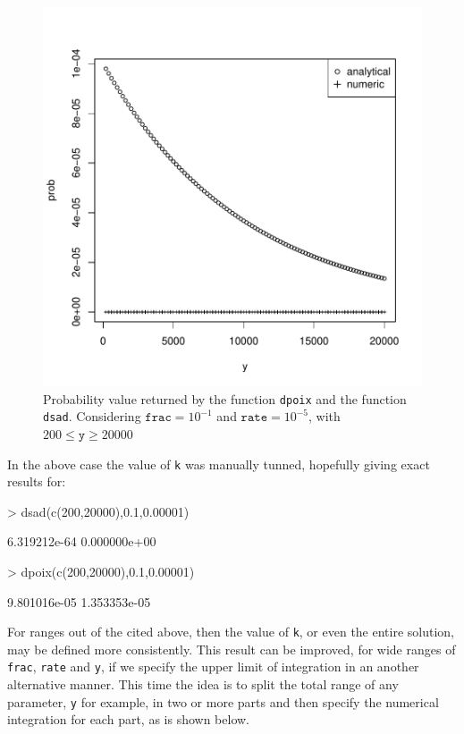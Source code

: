 \documentclass{article}
\newcommand{\code}[1]{\texttt{#1}}
\begin{document}
\begin{figure}[ht]
  \begin{center}
\includegraphics{sads_logbook-009}
\end{center}
\caption{Probability value returned by the function \code{dpoix} and the function \code{dsad}. Considering $\code{frac}=10^{-1}$ and $\code{rate}=10^{-5}$, with $200 \leq \code{y} \geq 20000$}
\label{fig:k}
\end{figure}

In the above case the value of \code{k} was manually tunned, hopefully giving exact results for:

\begin{Schunk}
\begin{Sinput}
> dsad(c(200,20000),0.1,0.00001)
\end{Sinput}
\begin{Soutput}
[1] 6.319212e-64 0.000000e+00
\end{Soutput}
\begin{Sinput}
> dpoix(c(200,20000),0.1,0.00001)
\end{Sinput}
\begin{Soutput}
[1] 9.801016e-05 1.353353e-05
\end{Soutput}
\end{Schunk}

For ranges out of the cited above, then the value of \code{k}, or even the entire solution, may be defined more consistently. This result can be improved, for wide ranges of \code{frac}, \code{rate} and \code{y}, if we specify 
the upper limit of integration in an another alternative manner. This time the idea is to split the total range of any parameter, \code{y} for example, in two or more parts and then specify the numerical integration for each part, as is shown below.
\end{document}

